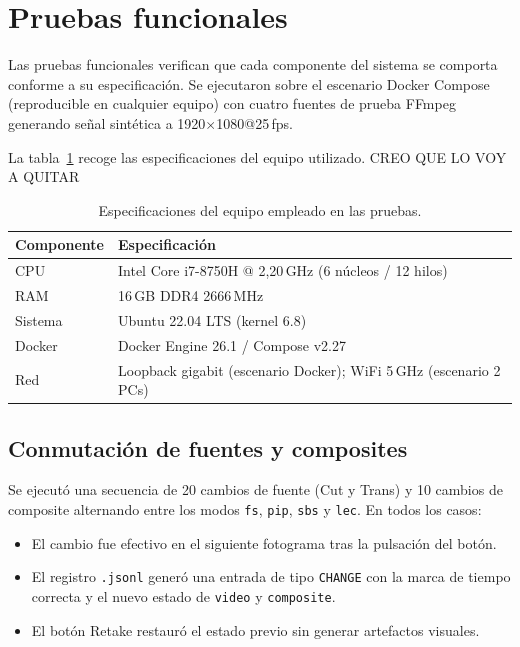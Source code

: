 \section{Pruebas funcionales}
\label{sec:pruebas_funcionales}

Las pruebas funcionales verifican que cada componente del sistema se comporta
conforme a su especificación. Se ejecutaron sobre el escenario Docker Compose
(reproducible en cualquier equipo) con cuatro fuentes de prueba FFmpeg generando
señal sintética a 1920$\times$1080@25\,fps.

La tabla~\ref{tab:hardware} recoge las especificaciones del equipo utilizado. CREO QUE LO VOY A QUITAR

\begin{table}[H]
  \centering
  \caption{Especificaciones del equipo empleado en las pruebas.}
  \label{tab:hardware}
  \begin{tabular}{|l|l|}
    \hline
    \textbf{Componente} & \textbf{Especificación} \\
    \hline
    CPU      & Intel Core i7-8750H @ 2,20\,GHz (6 núcleos / 12 hilos) \\
    RAM      & 16\,GB DDR4 2666\,MHz \\
    Sistema  & Ubuntu 22.04 LTS (kernel 6.8) \\
    Docker   & Docker Engine 26.1 / Compose v2.27 \\
    Red      & Loopback gigabit (escenario Docker); WiFi 5\,GHz (escenario 2\,PCs) \\
    \hline
  \end{tabular}
\end{table}

\subsection{Conmutación de fuentes y composites}

Se ejecutó una secuencia de 20 cambios de fuente (Cut y Trans) y 10 cambios de
composite alternando entre los modos \texttt{fs}, \texttt{pip}, \texttt{sbs} y
\texttt{lec}. En todos los casos:

\begin{itemize}
  \item El cambio fue efectivo en el siguiente fotograma tras la pulsación del botón.
  \item El registro \texttt{.jsonl} generó una entrada de tipo \texttt{CHANGE} con
        la marca de tiempo correcta y el nuevo estado de \texttt{video} y
        \texttt{composite}.
  \item El botón Retake restauró el estado previo sin generar artefactos visuales.
\end{itemize}

